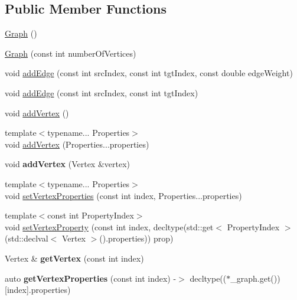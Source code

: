 \subsection*{Public Member Functions}
\begin{DoxyCompactItemize}
\item 
\hyperlink{a00035_a168a916da7346d0af307a75121f80ca4}{Graph} ()
\item 
\hyperlink{a00035_ab513bb56f7a3ede4891aafc586a31717}{Graph} (const int number\+Of\+Vertices)
\item 
void \hyperlink{a00035_a69ddb8cdc899ba47174f0e65b60a75dd}{add\+Edge} (const int src\+Index, const int tgt\+Index, const double edge\+Weight)
\item 
void \hyperlink{a00035_ae9dcc413d7e9b774b6bf2963c261f5fa}{add\+Edge} (const int src\+Index, const int tgt\+Index)
\item 
void \hyperlink{a00035_a99f45a817a10a62dd5f2f8c9a1734d8a}{add\+Vertex} ()
\item 
{\footnotesize template$<$typename... Properties$>$ }\\void \hyperlink{a00035_aa96658ad91d64e71cbd7a88d479bf7e4}{add\+Vertex} (Properties...\+properties)
\item 
void {\bfseries add\+Vertex} (Vertex \&vertex)\hypertarget{a00035_a2eef95bbacd0a7194dea4f81beb1cb37}{}\label{a00035_a2eef95bbacd0a7194dea4f81beb1cb37}

\item 
{\footnotesize template$<$typename... Properties$>$ }\\void \hyperlink{a00035_abe79a4cb96d48abcd03df01dae73fcc3}{set\+Vertex\+Properties} (const int index, Properties...\+properties)
\item 
{\footnotesize template$<$const int Property\+Index$>$ }\\void \hyperlink{a00035_aeeb65835e8a16ebba34da08ea8016fac}{set\+Vertex\+Property} (const int index, decltype(std\+::get$<$ Property\+Index $>$(std\+::declval$<$ Vertex $>$().properties)) prop)
\item 
Vertex \& {\bfseries get\+Vertex} (const int index)\hypertarget{a00035_a401589d879abd25f69e38fd197138531}{}\label{a00035_a401589d879abd25f69e38fd197138531}

\item 
auto {\bfseries get\+Vertex\+Properties} (const int index) -\/$>$ decltype(($\ast$\+\_\+graph.\+get())\mbox{[}index\mbox{]}.properties)\hypertarget{a00035_abe1f333b2c9a9f597fb68c00bf44e7f7}{}\label{a00035_abe1f333b2c9a9f597fb68c00bf44e7f7}


\end{DoxyCompactItemize}
